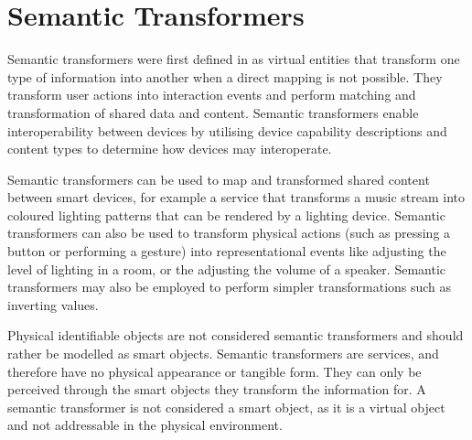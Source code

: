 \section{Semantic Transformers}
\label{SemanticTransformers}

Semantic transformers were first defined in \cite{Niezen2011} as virtual entities that transform one type of information into another when a direct mapping is not possible. They transform user actions into interaction events and perform matching and transformation of shared data and content. Semantic transformers enable interoperability between devices by utilising device capability descriptions and content types to determine how devices may interoperate.


Semantic transformers can be used to map and transformed shared content between smart devices, for example a service that transforms a music stream into coloured lighting patterns that can be rendered by a lighting device. Semantic transformers can also be used to transform physical actions (such as pressing a button or performing a gesture) into representational events like adjusting the level of lighting in a room, or the adjusting the volume of a speaker. Semantic transformers may also be employed to perform simpler transformations such as inverting values. 

Physical identifiable objects are not considered semantic transformers and should rather be modelled as smart objects. Semantic transformers are services, and therefore have no physical appearance or tangible form. They can only be perceived through the smart objects they transform the information for. A semantic transformer is not considered a smart object, as it is a virtual object and not addressable in the physical environment.




% 
% 



